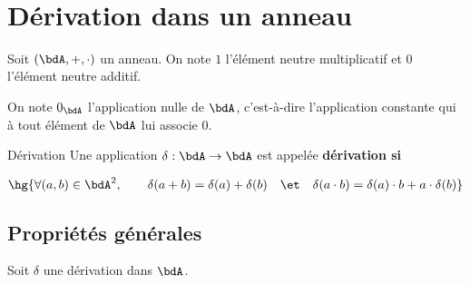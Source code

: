 \documentclass[a4paper,french,bookmarks]{article}
\begin{document}
\\[-40pt]
\section{Dérivation dans un anneau}

Soit $(\bdA, +, \cdot)$ un anneau. On note $1$ l'élément neutre multiplicatif et $0$ l'élément neutre additif.

On note $0_\bdA$ l'application nulle de $\bdA$, c'est-à-dire l'application constante qui à tout élément de $\bdA$ lui associe $0$.

\begin{definition*}{Dérivation}{}
    Une application $\delta : \bdA \to \bdA$ est appelée \bf{dérivation} si
    
    \[ \hg{\forall (a, b) \in \bdA^2,\qquad \delta(a+b) = \delta(a) + \delta(b) \quad\et\quad \delta(a\cdot b) = \delta(a)\cdot b + a \cdot \delta(b)}\]
\end{definition*}

\subsection{Propriétés générales}

Soit $\delta$ une dérivation dans $\bdA$.
\end{document}
